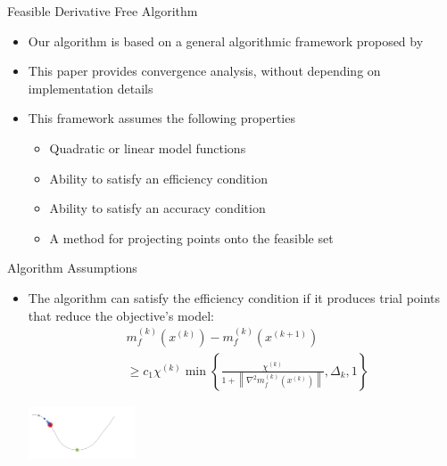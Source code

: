 \documentclass{beamer}
\newcommand{\xk}{{{x}^{(k)}}}
\begin{document}
\begin{frame}{Feasible Derivative Free Algorithm}
	\begin{itemize}
		\item Our algorithm is based on a general algorithmic framework proposed by \cite{CONEJO2013324}
		\item This paper provides convergence analysis, without depending on implementation details
		\item This framework assumes the following properties
			\begin{itemize}
				\item Quadratic or linear model functions
				\item Ability to satisfy an efficiency condition
				\item Ability to satisfy an accuracy condition
				\item A method for projecting points onto the feasible set
			\end{itemize}
	\end{itemize}
\end{frame}


\begin{frame}{Algorithm Assumptions}
	\begin{itemize}
		\item The algorithm can satisfy the efficiency condition if it produces trial points that reduce the objective's model:
		\begin{align*}
			& m_f^{(k)}\left(\xk\right) - m_f^{(k)}\left(x^{(k+1)}\right) \\
			& \ge c_1 \chi^{(k)} \min \left\{
				\frac{\chi^{(k)}}{1 + \left\|\nabla^2 m_f^{(k)}\left(x^{(k)}\right)\right\|},
				\Delta_k, 1\right\}
		\end{align*}

		\begin{center}
			\includegraphics[width=120px]{images/sufficient_reduction.png}
		\end{center}
	\end{itemize}
\end{frame}
\end{document}
